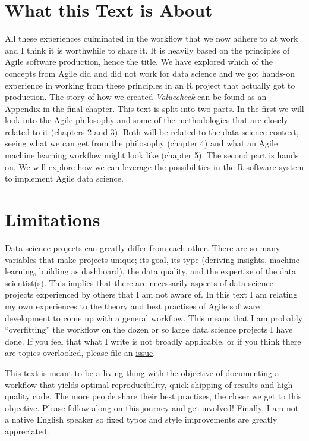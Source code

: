 \documentclass[]{book}
\begin{document}
\hypertarget{what-this-text-is-about}{%
\section{What this Text is About}\label{what-this-text-is-about}}

All these experiences culminated in the workflow that we now adhere to at work and I think it is worthwhile to share it.
It is heavily based on the principles of Agile software production, hence the title.
We have explored which of the concepts from Agile did and did not work for data science and we got hands-on experience in working from these principles in an R project that actually got to production.
The story of how we created \emph{Valuecheck} can be found as an Appendix in the final chapter.
This text is split into two parts.
In the first we will look into the Agile philosophy and some of the methodologies that are closely related to it (chapters 2 and 3).
Both will be related to the data science context, seeing what we can get from the philosophy (chapter 4) and what an Agile machine learning workflow might look like (chapter 5).
The second part is hands on. We will explore how we can leverage the possibilities in the R software system to implement Agile data science.

\hypertarget{limitations}{%
\section{Limitations}\label{limitations}}

Data science projects can greatly differ from each other.
There are so many variables that make projects unique; its goal, its type (deriving insights, machine learning, building as dashboard), the data quality, and the expertise of the data scientist(s).
This implies that there are necessarily aspects of data science projects experienced by others that I am not aware of.
In this text I am relating my own experiences to the theory and best practises of Agile software development to come up with a general workflow.
This means that I am probably ``overfitting'' the workflow on the dozen or so large data science projects I have done.
If you feel that what I write is not broadly applicable, or if you think there are topics overlooked, please file an \href{https://github.com/EdwinTh/ADSwR}{issue}.

This text is meant to be a living thing with the objective of documenting a workflow that yields optimal reproducibility, quick shipping of results and high quality code.
The more people share their best practises, the closer we get to this objective.
Please follow along on this journey and get involved!
Finally, I am not a native English speaker so fixed typos and style improvements are greatly appreciated.
\end{document}
